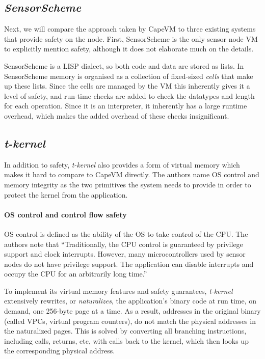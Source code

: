 \subsection{\emph{SensorScheme}}
Next, we will compare the approach taken by CapeVM to three existing systems that provide safety on the node. First, SensorScheme is the only sensor node VM to explicitly mention safety, although it does not elaborate much on the details.

SensorScheme is a LISP dialect, so both code and data are stored as lists. In SensorScheme memory is organised as a collection of fixed-sized \emph{cells} that make up these lists. Since the cells are managed by the VM this inherently gives it a level of safety, and run-time checks are added to check the datatypes and length for each operation. Since it is an interpreter, it inherently has a large runtime overhead, which makes the added overhead of these checks insignificant.




\subsection{\emph{t-kernel}}
In addition to safety, \emph{t-kernel} also provides a form of virtual memory which makes it hard to compare to CapeVM directly. The authors name OS control and memory integrity as the two primitives the system needs to provide in order to protect the kernel from the application.

\paragraph{OS control and control flow safety}
OS control is defined as the ability of the OS to take control of the CPU. The authors note that “Traditionally, the CPU control is guaranteed by privilege support and clock interrupts. However, many microcontrollers used by sensor nodes do not have privilege support. The application can disable interrupts and occupy the CPU for an arbitrarily long time.”

To implement its virtual memory features and safety guarantees, \emph{t-kernel} extensively rewrites, or \emph{naturalizes}, the application's binary code at run time, on demand, one 256-byte page at a time. As a result, addresses in the original binary (called VPCs, virtual program counters), do not match the physical addresses in the naturalized pages. This is solved by converting all branching instructions, including calls, returns, etc, with calls back to the kernel, which then looks up the corresponding physical address.

